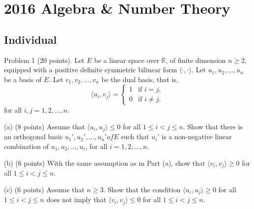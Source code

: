 \section{2016 Algebra \& Number Theory}

\subsection*{Individual}
\begin{exercise}
\label{algebra:2016:1}
Problem 1 (20 points). Let $E$ be a linear space over $\mathbb{R}$, of finite dimension $n \geq 2$, equipped with a positive definite symmetric bilinear form $\langle \cdot, \cdot \rangle$. Let $u_1, u_2, \ldots, u_n$ be a basis of $E$. Let $v_1, v_2, \ldots, v_n$ be the dual basis, that is,
$$\langle u_i, v_j \rangle = \begin{cases} 1 & \text{if } i = j, \\ 0 & \text{if } i \neq j, \end{cases}$$
for all $i, j = 1, 2, \ldots, n$.

(a) (8 points) Assume that $\langle u_i, u_j \rangle \leq 0$ for all $1 \leq i < j \leq n$. Show that there is an orthogonal basis $u_1', u_2', \ldots, u_n' of E$ such that $u_i'$ is a non-negative linear combination of $u_1, u_2, \ldots, u_i$, for all $i = 1, 2, \ldots, n$.

(b) (6 points) With the same assumption as in Part (a), show that $\langle v_i, v_j \rangle \geq 0$ for all $1 \leq i < j \leq n$.

(c) (6 points) Assume that $n \geq 3$. Show that the condition $\langle u_i, u_j \rangle \geq 0$ for all $1 \leq i < j \leq n$ does not imply that $\langle v_i, v_j \rangle \leq 0$ for all $1 \leq i < j \leq n$.
\end{exercise}
